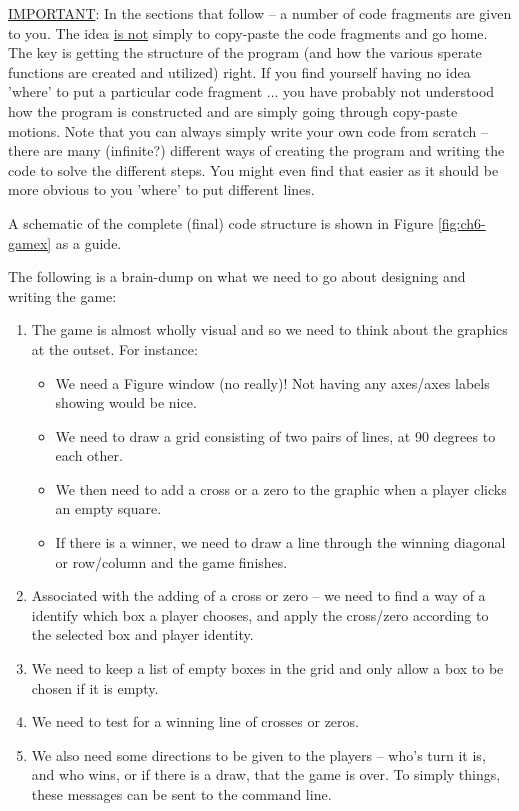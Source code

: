 \documentclass{tufte-book} %
\begin{document}
\uline{IMPORTANT}: In the sections that follow -- a number of code fragments are given to you. The idea \uline{is not} simply to copy-paste the code fragments and go home. The key is getting the structure of the program (and how the various sperate functions are created and utilized) right. If you find yourself having no idea 'where' to put a particular code fragment ... you have probably not understood how the program is constructed and are simply going through copy-paste motions. Note that you can always simply write your own code from scratch -- there are many (infinite?) different ways of creating the program and writing the code to solve the different steps. You might even find that easier as it should be more obvious to you 'where' to put different lines.

A schematic of the complete (final) code structure is shown in Figure \ref{fig:ch6-gamex} as a guide.

The following is a brain-dump on what we need to go about designing and writing the game:

\begin{enumerate}[noitemsep]

\item The game is almost wholly visual and so we need to think about the graphics at the outset. For instance:
\begin{itemize}[noitemsep]
\setlength{\itemindent}{.2in}
\item We need a \textsf{Figure window} (no really)! Not having any axes/axes labels showing would be nice.
\item We need to draw a grid consisting of two pairs of lines, at 90 degrees to each other.
\item We then need to add a cross or a zero to the graphic when a player clicks an empty square.
\item If there is a winner, we need to draw a line through the winning diagonal or row/column and the game finishes.
\end{itemize}
\item Associated with the adding of a cross or zero -- we need to find a way of a  identify which box a player chooses, and apply the cross/zero according to the selected box and player identity.
\item We need to keep a list of empty boxes in the grid and only allow a box to be chosen if it is empty.
\item We need to test for a winning line of crosses or zeros.
\item We also need some directions to be given to the players -- who's turn it is, and who wins, or if there is a draw, that the game is over. To simply things, these messages can be sent to the command line.
\end{enumerate}
\end{document}
